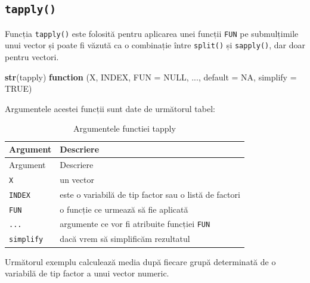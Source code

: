 \documentclass[]{article}
\newenvironment{Shaded}{\begin{snugshade}}{\end{snugshade}}
\newcommand{\KeywordTok}[1]{\textcolor[rgb]{0.13,0.29,0.53}{\textbf{#1}}}
\newcommand{\DataTypeTok}[1]{\textcolor[rgb]{0.13,0.29,0.53}{#1}}
\newcommand{\OtherTok}[1]{\textcolor[rgb]{0.56,0.35,0.01}{#1}}
\newcommand{\ControlFlowTok}[1]{\textcolor[rgb]{0.13,0.29,0.53}{\textbf{#1}}}
\newcommand{\NormalTok}[1]{#1}
\begin{document}
\subsection{\texorpdfstring{\texttt{tapply()}}{tapply()}}\label{tapply}

Funcția \texttt{tapply()} este folosită pentru aplicarea unei funcții
\texttt{FUN} pe submulțimile unui vector și poate fi văzută ca o
combinație între \texttt{split()} și \texttt{sapply()}, dar doar pentru
vectori.

\begin{Shaded}
\begin{Highlighting}[]
\KeywordTok{str}\NormalTok{(tapply)}
\ControlFlowTok{function}\NormalTok{ (X, INDEX, }\DataTypeTok{FUN =} \OtherTok{NULL}\NormalTok{, ..., }\DataTypeTok{default =} \OtherTok{NA}\NormalTok{, }\DataTypeTok{simplify =} \OtherTok{TRUE}\NormalTok{)  }
\end{Highlighting}
\end{Shaded}

Argumentele acestei funcții sunt date de următorul tabel:

\begin{longtable}[]{@{}ll@{}}
\caption{Argumentele functiei tapply}\tabularnewline
\toprule
Argument & Descriere\tabularnewline
\midrule
\endfirsthead
\toprule
Argument & Descriere\tabularnewline
\midrule
\endhead
\texttt{X} & un vector\tabularnewline
\texttt{INDEX} & este o variabilă de tip factor sau o listă de
factori\tabularnewline
\texttt{FUN} & o funcție ce urmează să fie aplicată\tabularnewline
\texttt{...} & argumente ce vor fi atribuite funcției
\texttt{FUN}\tabularnewline
\texttt{simplify} & dacă vrem să simplificăm rezultatul\tabularnewline
\bottomrule
\end{longtable}

Următorul exemplu calculează media după fiecare grupă determinată de o
variabilă de tip factor a unui vector numeric.
\end{document}

